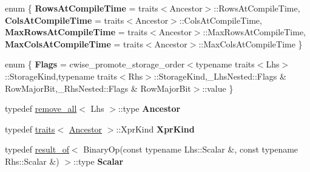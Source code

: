 \begin{DoxyCompactItemize}
enum \{ {\bfseries Rows\+At\+Compile\+Time} = traits$<$Ancestor$>$\+:\+:Rows\+At\+Compile\+Time, 
{\bfseries Cols\+At\+Compile\+Time} = traits$<$Ancestor$>$\+:\+:Cols\+At\+Compile\+Time, 
{\bfseries Max\+Rows\+At\+Compile\+Time} = traits$<$Ancestor$>$\+:\+:Max\+Rows\+At\+Compile\+Time, 
{\bfseries Max\+Cols\+At\+Compile\+Time} = traits$<$Ancestor$>$\+:\+:Max\+Cols\+At\+Compile\+Time
 \}
\item 
\mbox{\label{struct_eigen_1_1internal_1_1traits_3_01_cwise_binary_op_3_01_binary_op_00_01_lhs_00_01_rhs_01_4_01_4_a4c2510a81638df6646028787293564be}} 
enum \{ {\bfseries Flags} = cwise\+\_\+promote\+\_\+storage\+\_\+order$<$typename traits$<$Lhs$>$\+:\+:Storage\+Kind,typename traits$<$Rhs$>$\+:\+:Storage\+Kind,\+\_\+\+Lhs\+Nested\+:\+:Flags \& Row\+Major\+Bit,\+\_\+\+Rhs\+Nested\+:\+:Flags \& Row\+Major\+Bit$>$\+:\+:value
 \}
\item 
\mbox{\label{struct_eigen_1_1internal_1_1traits_3_01_cwise_binary_op_3_01_binary_op_00_01_lhs_00_01_rhs_01_4_01_4_afabc96be713b502009dfe217045d8248}} 
typedef \hyperlink{struct_eigen_1_1internal_1_1remove__all}{remove\+\_\+all}$<$ Lhs $>$\+::type {\bfseries Ancestor}
\item 
\mbox{\label{struct_eigen_1_1internal_1_1traits_3_01_cwise_binary_op_3_01_binary_op_00_01_lhs_00_01_rhs_01_4_01_4_a9ed2c0723977ac9cb53448b82bb79ced}} 
typedef \hyperlink{struct_eigen_1_1internal_1_1traits}{traits}$<$ \hyperlink{group___sparse_core___module}{Ancestor} $>$\+::Xpr\+Kind {\bfseries Xpr\+Kind}
\item 
\mbox{\label{struct_eigen_1_1internal_1_1traits_3_01_cwise_binary_op_3_01_binary_op_00_01_lhs_00_01_rhs_01_4_01_4_a98036d3d2f44b28a6cf76ef3ed6a299c}} 
typedef \hyperlink{struct_eigen_1_1internal_1_1result__of}{result\+\_\+of}$<$ Binary\+Op(const typename Lhs\+::\+Scalar \&, const typename Rhs\+::\+Scalar \&) $>$\+::type {\bfseries Scalar}
\item 
\mbox{\label{struct_eigen_1_1internal_1_1traits_3_01_cwise_binary_op_3_01_binary_op_00_01_lhs_00_01_rhs_01_4_01_4_a1a16cc45c6cee640f7e36d6b444ed396}} 

\end{DoxyCompactItemize}
